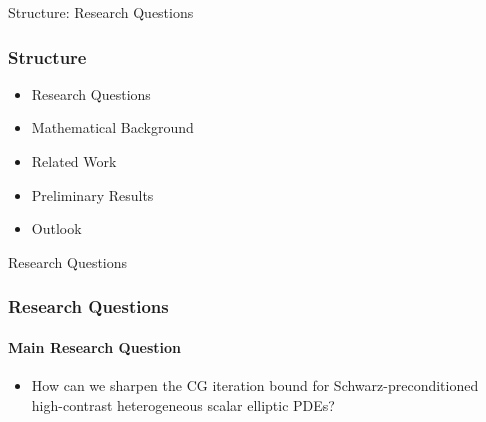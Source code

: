 \begin{frame}{Structure: Research Questions}
    \frametitle{Structure}
    \begin{itemize}
        \item {\color{tud grapefruit}Research Questions}
        \item Mathematical Background
        \item Related Work
        \item Preliminary Results
        \item Outlook
    \end{itemize}
\end{frame}

\begin{frame}{Research Questions}
    \frametitle{Research Questions}
    \framesubtitle{Main Research Question}
    \begin{itemize}
        \item How can we sharpen the CG iteration bound for Schwarz-preconditioned high-contrast heterogeneous scalar elliptic PDEs?
    \end{itemize}
\end{frame}

